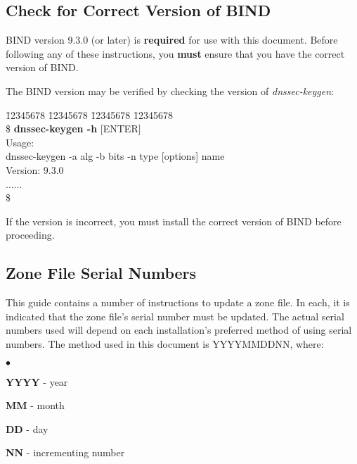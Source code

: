 \documentclass[12pt]{article}
\newenvironment{packed}{\begin{list}{$\bullet$}{\parsep0in\itemsep0in}}{\end{list}}
\newcommand{\cmd}[1]{{\em #1}}
\begin{document}
\clearpage
\subsection{Check for Correct Version of BIND}
\label{check-bind}

BIND version 9.3.0 (or later) is {\bf required} for use with this document.
Before following any of these instructions, you {\bf must} ensure that you
have the correct version of BIND.

The BIND version may be verified by checking the version of
\cmd{dnssec-keygen}:

\begin{tabbing}
\hspace{0.5in} \= 12345678 \= 12345678 \= 12345678 \= 12345678 \kill \\
\hspace{0.5in} \$ {\bf dnssec-keygen -h} $[$ENTER$]$ \\
\hspace{0.5in} Usage: \\
\hspace{0.5in} \>dnssec-keygen -a alg -b bits -n type [options] name \\
\hspace{0.5in} Version: 9.3.0 \\
\hspace{0.5in} ...... \\
\hspace{0.5in} \$
\end{tabbing}

If the version is incorrect, you must install the correct version of BIND
before proceeding.


\subsection{Zone File Serial Numbers}
\label{zone-serials}

This guide contains a number of instructions to update a zone file.  In each,
it is indicated that the zone file's serial number must be updated.  The
actual serial numbers used will depend on each installation's preferred method
of using serial numbers.  The method used in this document is YYYYMMDDNN,
where:
\begin{packed}
\item {\bf YYYY} - year
\item {\bf MM} - month
\item {\bf DD} - day
\item {\bf NN} - incrementing number
\end{packed}
\end{document}
